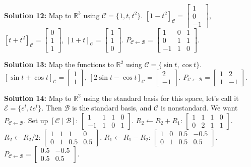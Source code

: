 \documentclass[11pt]{article}
\begin{document}
\vspace{0.5cm}
\textbf{Solution 12:} Map to $\mathbb{R}^3$ using $\mathcal{C} = \{1, t, t^2\}$.
$[1-t^2]_{\mathcal{C}} = \begin{bmatrix} 1 \\ 0 \\ -1 \end{bmatrix}$, $[t+t^2]_{\mathcal{C}} = \begin{bmatrix} 0 \\ 1 \\ 1 \end{bmatrix}$, $[1+t]_{\mathcal{C}} = \begin{bmatrix} 1 \\ 1 \\ 0 \end{bmatrix}$.
$P_{\mathcal{C} \leftarrow \mathcal{B}} = \begin{bmatrix} 1 & 0 & 1 \\ 0 & 1 & 1 \\ -1 & 1 & 0 \end{bmatrix}$.

\vspace{0.5cm}
\textbf{Solution 13:} Map the functions to $\mathbb{R}^2$ using $\mathcal{C} = \{\sin t, \cos t\}$.
$[\sin t + \cos t]_{\mathcal{C}} = \begin{bmatrix} 1 \\ 1 \end{bmatrix}$, $[2\sin t - \cos t]_{\mathcal{C}} = \begin{bmatrix} 2 \\ -1 \end{bmatrix}$.
$P_{\mathcal{C} \leftarrow \mathcal{B}} = \begin{bmatrix} 1 & 2 \\ 1 & -1 \end{bmatrix}$.

\vspace{0.5cm}
\textbf{Solution 14:} Map to $\mathbb{R}^2$ using the standard basis for this space, let's call it $\mathcal{E} = \{e^t, te^t\}$.
Then $\mathcal{B}$ is the standard basis, and $\mathcal{C}$ is nonstandard.
We want $P_{\mathcal{C} \leftarrow \mathcal{B}}$. Set up $[\mathcal{C} \mid \mathcal{B}]$:
$\begin{bmatrix} 1 & 1 & 1 & 0 \\ -1 & 1 & 0 & 1 \end{bmatrix}$.
$R_2 \leftarrow R_2 + R_1$: $\begin{bmatrix} 1 & 1 & 1 & 0 \\ 0 & 2 & 1 & 1 \end{bmatrix}$.
$R_2 \leftarrow R_2 / 2$: $\begin{bmatrix} 1 & 1 & 1 & 0 \\ 0 & 1 & 0.5 & 0.5 \end{bmatrix}$.
$R_1 \leftarrow R_1 - R_2$: $\begin{bmatrix} 1 & 0 & 0.5 & -0.5 \\ 0 & 1 & 0.5 & 0.5 \end{bmatrix}$.
$P_{\mathcal{C} \leftarrow \mathcal{B}} = \begin{bmatrix} 0.5 & -0.5 \\ 0.5 & 0.5 \end{bmatrix}$.
\end{document}
